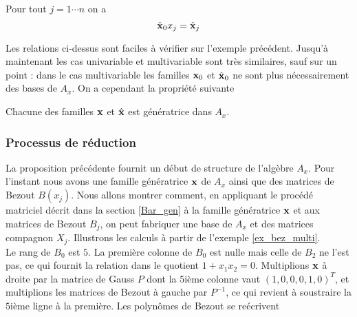 \documentclass{standalone}
\begin{document}
\begin{prop}
\label{xj}
Pour tout $j=1\cdots n$ on a
\begin{equation}
    \hat{\bold{x}}_0x_j = \hat{\bold{x}}_j
\end{equation}
\end{prop}

Les relations ci-dessus sont faciles à vérifier sur l'exemple précédent. Jusqu'à maintenant les cas univariable et multivariable sont très similaires, sauf sur un point : dans le cas multivariable les familles $\bold{x}_0$ et $\hat{\bold{x}}_0$ ne sont plus nécessairement des bases de $A_x$. On a cependant la propriété suivante

\begin{prop}
Chacune des familles $\bold{x}$ et $\hat{\bold{x}}$ est génératrice dans $A_x$.
\end{prop}





\subsubsection{Processus de réduction}
La proposition précédente fournit un début de structure de l'algèbre $A_x$. Pour l'instant nous avons une famille génératrice $\bold{x}$ de $A_x$ ainsi que des matrices de Bezout $B(x_j)$.
Nous allons montrer comment, en appliquant le procédé matriciel décrit dans la section \ref{Bar_gen} à la famille génératrice $\bold{x}$ et aux matrices de Bezout $B_j$, on peut fabriquer une base de $A_x$ et des matrices compagnon $X_j$.
Illustrons les calculs à partir de l'exemple \ref{ex_bez_multi}.\\
Le rang de $B_0$ est $5$. La première colonne de $B_0$ est nulle mais celle de $B_2$ ne l'est pas, ce qui fournit la relation dans le quotient $1 + x_1x_2 = 0$.
Multiplions $\bold{x}$ à droite par la matrice de Gauss $P$ dont la $5$ième colonne vaut $(1, 0, 0, 0, 1, 0)^{T}$, et multiplions les matrices de Bezout à gauche par $P^{-1}$, ce qui revient à soustraire la $5$ième ligne à la première.
Les polynômes de Bezout se reécrivent\\
\end{document}

